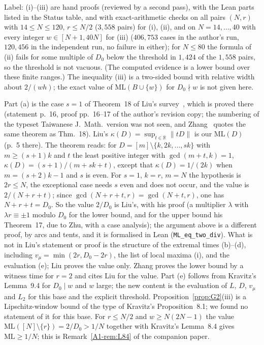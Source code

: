 \documentclass[11pt]{article}
\theoremstyle{definition}
\theoremstyle{remark}
\newcommand{\ML}{\mathrm{ML}}
\newcommand{\RR}{\mathbb{R}}
\newcommand{\xA}[1]{\ref{A1-#1}}
\begin{document}
Label: (i)--(iii) are hand proofs (reviewed by a second pass), with the Lean parts listed in the Status table, and with exact-arithmetic checks on all pairs $(N,r)$ with $14\le N\le120$, $r\le N/2$ ($3{,}558$ pairs) for (i), (ii), and on $N=14,\dots,40$ with every integer $w\in[N+1,40N]$ for (iii) ($406{,}753$ cases in the author's run, $120{,}456$ in the independent run, no failure in either); for $N\le80$ the formula of (ii) fails for some multiple of $D_0$ below the threshold in $1{,}424$ of the $1{,}558$ pairs, so the threshold is not vacuous. (The computed evidence is a lower bound over these finite ranges.) The inequality (iii) is a two-sided bound with relative width about $2/(wh)$; the exact value of $\ML(B\cup\{w\})$ for $D_0\nmid w$ is not given here.


Part (a) is the case $s=1$ of Theorem~18 of Liu's survey~\cite{L}, which is proved there (statement p.~16, proof pp.~16--17 of the author's revision copy; the numbering of the typeset Taiwanese J.\ Math.\ version was not seen, and Zhang~\cite[Section~2.3, introduction to Thm.~2.9]{Z} quotes the same theorem as Thm.~18). Liu's $\kappa(D)=\sup_{t\in\RR}\|tD\|$ is our $\ML(D)$ (p.~5 there). The theorem reads: for $D=[m]\setminus\{k,2k,\dots,sk\}$ with $m\ge(s+1)k$ and $t$ the least positive integer with $\gcd(m+t,k)=1$, $\kappa(D)=(s+1)/(m+sk+t)$, except that $\kappa(D)=1/(2k)$ when $m=(s+2)k-1$ and $s$ is even. For $s=1$, $k=r$, $m=N$ the hypothesis is $2r\le N$, the exceptional case needs $s$ even and does not occur, and the value is $2/(N+r+t)$; since $\gcd(N+r+t,r)=\gcd(N+t,r)$, one has $N+r+t=D_0$. So the value $2/D_0$ is Liu's, with his proof (a multiplier $\lambda$ with $\lambda r\equiv\pm1$ modulo $D_0$ for the lower bound, and for the upper bound his Theorem~17, due to Zhu, with a case analysis); the argument above is a different proof, by arcs and tents, and it is formalised in Lean (\texttt{ML\_eq\_two\_div}). What is not in Liu's statement or proof is the structure of the extremal times (b)--(d), including $v_\mu=\min(2r,D_0-2r)$, the list of local maxima (i), and the evaluation (e); Liu proves the value only. Zhang proves the lower bound by a witness time for $r=2$ and cites Liu for the value. Part (e) follows from Kravitz's Lemma~9.4 for $D_0\mid w$ and $w$ large; the new content is the evaluation of $L$, $D$, $v_\mu$ and $L_2$ for this base and the explicit threshold. Proposition~\ref{prop:G2}(iii) is a Lipschitz-window bound of the type of Kravitz's Proposition~8.1; we found no statement of it for this base. For $r\le N/2$ and $w\ge N(2N-1)$ the value $\ML([N]\setminus\{r\})=2/D_0>1/N$ together with Kravitz's Lemma~8.4 gives $\ML\ge1/N$; this is Remark~\xA{rem:L84} of the companion paper.
\end{document}
